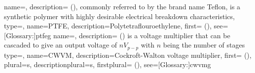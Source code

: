 {
    name={},
    description={ (), commonly referred to by the brand name Teflon, is a synthetic polymer with highly desirable electrical breakdown characteristics},
}
{
    type=\acronymtype,
    name={PTFE},
    description={Polytetraflouroethylene},
    first={ ()},
    see=[Glossary:]{ptfeg}
}
{
    name={},
    description={ () is a voltage multiplier that can be cascaded to give an output voltage of \(nV_{p-p}\) with \(n\) being the number of stages}
}
{
    type=\acronymtype,
    name={CWVM},
    description={Cockroft-Walton voltage multiplier},
    first={ ()},
    plural={s},
    descriptionplural={s},
    firstplural={ ()},
    see=[Glossary:]{cwvmg}
}
